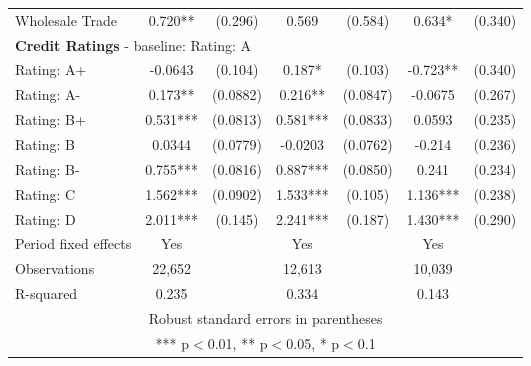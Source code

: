 \documentclass[12pt]{article}
\begin{document}
\begin{table}[H]
{\begin{tabular}{lcccccc}
    Wholesale Trade & 0.720** & (0.296) & 0.569 & (0.584) & 0.634* & (0.340)  \vspace{3mm} \\
    \multicolumn{7}{l}{\textbf{Credit Ratings} - baseline: Rating: A} \\
    Rating: A+ & -0.0643 & (0.104) & 0.187* & (0.103) & -0.723** & (0.340) \\
    Rating: A- & 0.173** & (0.0882) & 0.216** & (0.0847) & -0.0675 & (0.267) \\
    Rating: B+ & 0.531*** & (0.0813) & 0.581*** & (0.0833) & 0.0593 & (0.235) \\
    Rating: B & 0.0344 & (0.0779) & -0.0203 & (0.0762) & -0.214 & (0.236) \\
    Rating: B- & 0.755*** & (0.0816) & 0.887*** & (0.0850) & 0.241 & (0.234) \\
    Rating: C & 1.562*** & (0.0902) & 1.533*** & (0.105) & 1.136*** & (0.238) \\
    Rating: D & 2.011*** & (0.145) & 2.241*** & (0.187) & 1.430*** & (0.290) \\
    \midrule
    Period fixed effects & Yes & & Yes & & Yes & \\
    Observations & 22,652 & & 12,613 & & 10,039 & \\
    R-squared & 0.235 & & 0.334 & & 0.143 & \\
    \bottomrule
    \multicolumn{7}{c}{Robust standard errors in parentheses} \\
    \multicolumn{7}{c}{*** p$<$0.01, ** p$<$0.05, * p$<$0.1} \\
    \end{tabular}%
    }
\end{table}
\end{document}
